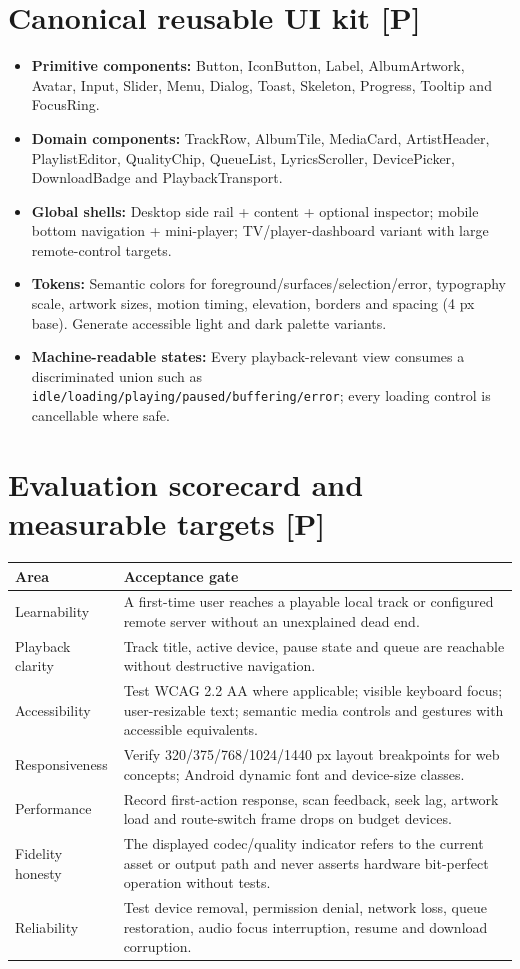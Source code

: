 \documentclass[10pt,a4paper,oneside]{report}
\begin{document}
\section*{Canonical reusable UI kit [P]}
\begin{itemize}[leftmargin=*,itemsep=3pt]
\item \textbf{Primitive components:} Button, IconButton, Label, AlbumArtwork, Avatar, Input, Slider, Menu, Dialog, Toast, Skeleton, Progress, Tooltip and FocusRing.
\item \textbf{Domain components:} TrackRow, AlbumTile, MediaCard, ArtistHeader, PlaylistEditor, QualityChip, QueueList, LyricsScroller, DevicePicker, DownloadBadge and PlaybackTransport.
\item \textbf{Global shells:} Desktop side rail + content + optional inspector; mobile bottom navigation + mini-player; TV/player-dashboard variant with large remote-control targets.
\item \textbf{Tokens:} Semantic colors for foreground/surfaces/selection/error, typography scale, artwork sizes, motion timing, elevation, borders and spacing (4 px base). Generate accessible light and dark palette variants.
\item \textbf{Machine-readable states:} Every playback-relevant view consumes a discriminated union such as \texttt{idle/loading/playing/paused/buffering/error}; every loading control is cancellable where safe.
\end{itemize}
\section*{Evaluation scorecard and measurable targets [P]}
\begin{tabularx}{\linewidth}{@{}p{42mm}X@{}}\toprule
Area & Acceptance gate\\\midrule
Learnability & A first-time user reaches a playable local track or configured remote server without an unexplained dead end.\\
Playback clarity & Track title, active device, pause state and queue are reachable without destructive navigation.\\
Accessibility & Test WCAG 2.2 AA where applicable; visible keyboard focus; user-resizable text; semantic media controls and gestures with accessible equivalents.\\
Responsiveness & Verify 320/375/768/1024/1440 px layout breakpoints for web concepts; Android dynamic font and device-size classes.\\
Performance & Record first-action response, scan feedback, seek lag, artwork load and route-switch frame drops on budget devices.\\
Fidelity honesty & The displayed codec/quality indicator refers to the current asset or output path and never asserts hardware bit-perfect operation without tests.\\
Reliability & Test device removal, permission denial, network loss, queue restoration, audio focus interruption, resume and download corruption.\\
\bottomrule\end{tabularx}
\end{document}
